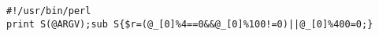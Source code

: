 \documentclass{article}
\begin{document}
\begin{lstlisting}
#!/usr/bin/perl
print S(@ARGV);sub S{$r=(@_[0]%4==0&&@_[0]%100!=0)||@_[0]%400=0;}
\end{lstlisting}


\end{document}
